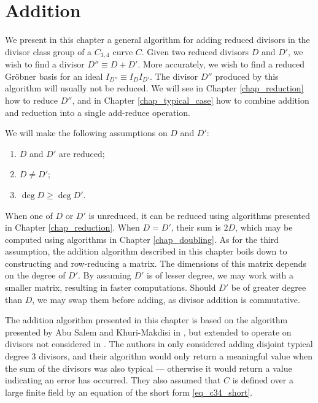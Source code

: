 
\section{Addition}
\label{chap_addition}

We present in this chapter a general algorithm for adding reduced divisors
in the divisor class group of a $C_{3,4}$ curve $C$.
Given two reduced divisors $D$ and $D'$, we wish to find a divisor $D'' \equiv D + D'$.
More accurately, we wish to find a reduced Gr\"obner basis for an ideal $I_{D''} \equiv I_{D}I_{D'}$.
The divisor $D''$ produced by this algorithm will usually not be reduced.
We will see in Chapter \ref{chap_reduction} how to reduce $D''$,
and in Chapter \ref{chap_typical_case} how to combine addition and reduction into a single add-reduce operation.

We will make the following assumptions on $D$ and $D'$:
\begin{enumerate}[label=(\roman*)]
  \item $D$ and $D'$ are reduced;
  \item $D \neq D'$;
  \item $\deg D \geq \deg D'$.
\end{enumerate}
When one of $D$ or $D'$ is unreduced, it can be reduced using algorithms presented in Chapter \ref{chap_reduction}.
When $D = D'$, their sum is $2D$, which may be computed using algorithms in Chapter \ref{chap_doubling}.
As for the third assumption,
the addition algorithm described in this chapter boils down to constructing and row-reducing a matrix.
The dimensions of this matrix depends on the degree of $D'$.
By assuming $D'$ is of lesser degree, we may work with a smaller matrix, resulting in faster computations.
Should $D'$ be of greater degree than $D$, we may swap them before adding, as divisor addition is commutative.

The addition algorithm presented in this chapter
is based on the algorithm presented by Abu Salem and Khuri-Makdisi in \cite{salem07},
but extended to operate on divisors not considered in \cite{salem07}.
The authors in \cite{salem07} only considered adding disjoint typical degree 3 divisors,
and their algorithm would only return a meaningful value
when the sum of the divisors was also typical ---
otherwise it would return a value indicating an error has occurred.
They also assumed that $C$ is defined over a large finite field
by an equation of the short form \ref{eq_c34_short}.

